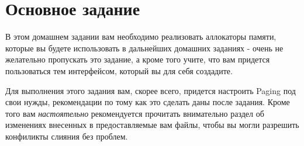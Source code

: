 \section{Основное задание}

В этом домашнем задании вам необходимо реализовать аллокаторы памяти, которые
вы будете использовать в дальнейших домашних заданиях - очень не желательно
пропускать это задание, а кроме того учите, что вам придется пользоваться тем
интерфейсом, который вы для себя создадите.

Для выполнения этого задания вам, скорее всего, придется настроить Paging под
свои нужды, рекомендации по тому как это сделать даны после задания. Кроме того
вам \emph{настоятельно} рекомендуется прочитать внимательно раздел об изменениях
внесенных в предоставляемые вам файлы, чтобы вы могли разрешить конфиликты
слияния без проблем.

